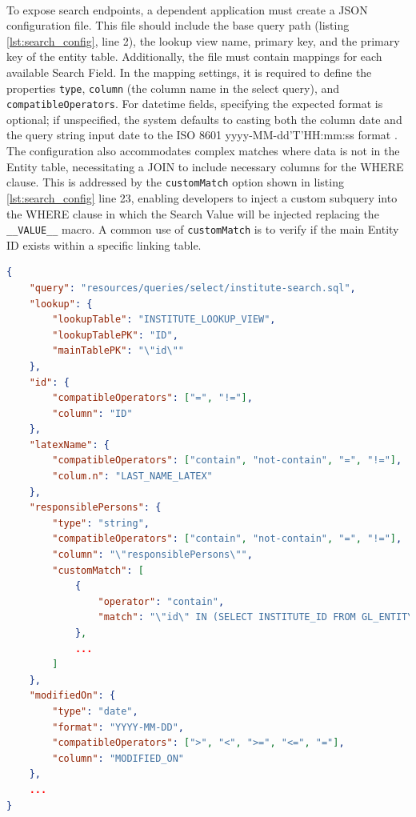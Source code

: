 \paragraph{} To expose search endpoints, a dependent application must create a JSON configuration file. This file should include the base query path (listing \ref{lst:search_config}, line 2), the lookup view name, primary key, and the primary key of the entity table. Additionally, the file must contain mappings for each available Search Field. In the mapping settings, it is required to define the properties \texttt{type}, \texttt{column} (the column name in the select query), and \texttt{compatibleOperators}. For datetime fields, specifying the expected format is optional; if unspecified, the system defaults to casting both the column date and the query string input date to the ISO 8601 yyyy-MM-dd'T'HH:mm:ss format \cite{iso8601wikipedia}. The configuration also accommodates complex matches where data is not in the Entity table, necessitating a JOIN to include necessary columns for the WHERE clause. This is addressed by the \texttt{customMatch} option shown in listing \ref{lst:search_config} line 23, enabling developers to inject a custom subquery into the WHERE clause in which the Search Value will be injected replacing the \texttt{\_\_VALUE\_\_} macro. A common use of \texttt{customMatch} is to verify if the main Entity ID exists within a specific linking table.

\begin{lstlisting}[language=json, caption={Search configuration example.}, basicstyle=\tiny, label=lst:search_config]
{
    "query": "resources/queries/select/institute-search.sql",
    "lookup": {
        "lookupTable": "INSTITUTE_LOOKUP_VIEW",
        "lookupTablePK": "ID",
        "mainTablePK": "\"id\""
    },
    "id": {
        "compatibleOperators": ["=", "!="],
        "column": "ID"
    },
    "latexName": {
        "compatibleOperators": ["contain", "not-contain", "=", "!="],
        "colum.n": "LAST_NAME_LATEX"
    },
    "responsiblePersons": {
        "type": "string",
        "compatibleOperators": ["contain", "not-contain", "=", "!="],
        "column": "\"responsiblePersons\"",
        "customMatch": [
            {
                "operator": "contain",
                "match": "\"id\" IN (SELECT INSTITUTE_ID FROM GL_ENTITY_RESPONSIBLE WHERE RESPONSIBLE_ID = __VALUE__)"
            },
            ...
        ]
    },
    "modifiedOn": {
        "type": "date",
        "format": "YYYY-MM-DD",
        "compatibleOperators": [">", "<", ">=", "<=", "="],
        "column": "MODIFIED_ON"
    },
    ...
}
\end{lstlisting}

